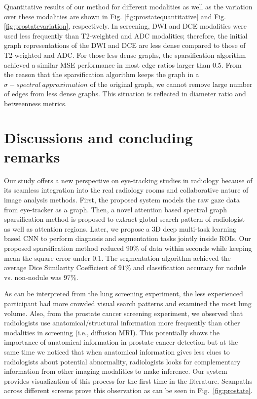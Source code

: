\documentclass[preprint,12pt]{elsarticle}
\begin{document}
Quantitative results of our method for different modalities as well as the variation over these modalities are shown in Fig. \ref{fig:prostatequantitative} and Fig. \ref{fig:prostatevariation}, respectively. In screening, DWI and DCE modalities were used less frequently than T2-weighted and ADC modalities; therefore, the initial graph representations of the DWI and DCE are less dense compared to those of T2-weighted and ADC. For those less dense graphs, the sparsification algorithm  achieved a similar MSE performance in most edge ratios larger than 0.5. From the reason that  the sparsification algorithm keeps the graph in a $\sigma-spectral~approximation$ of the original graph, we cannot remove large number of edges from less dense graphs. This situation is reflected in diameter ratio and betweenness metrics. %






\section{Discussions and concluding remarks}
Our study offers a new perspective on eye-tracking studies in radiology because of its seamless integration into the real radiology rooms and collaborative nature of image analysis methods. First, the proposed system models the raw gaze data from eye-tracker as a graph. Then, a novel attention based spectral graph sparsification method is proposed to extract global search pattern of radiologist as well as attention regions. Later, we propose a 3D deep multi-task learning based CNN to perform diagnosis and segmentation tasks jointly inside ROIs. Our proposed sparsification method reduced $90\%$ of data within seconds while keeping mean the square error under $0.1$. The segmentation algorithm achieved the average Dice Similarity Coefficient of $91\%$ and classification accuracy for nodule vs. non-nodule was $97\%$.


As can be interpreted from the lung screening experiment, the less experienced participant had more crowded visual search patterns and examined the most lung volume. Also, from the prostate cancer screening experiment, we observed that radiologists use anatomical/structural information more frequently than other modalities in screening (i.e., diffusion MRI). This potentially shows the importance of anatomical information in prostate cancer detection but at the same time we noticed that when anatomical information gives less clues to radiologists about potential abnormality, radiologists looks for complementary information from other imaging modalities to make inference. Our system provides visualization of this process for the first time in the literature. Scanpaths across different screens prove this observation as can be seen in Fig.~\ref{fig:prostate}.
\end{document}
